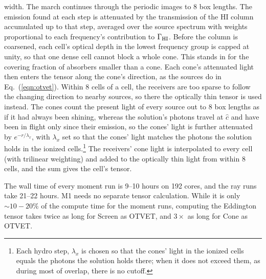 \documentclass[iop]{openjournal}
\begin{document}
\begin{itemize}
{  width. The march continues through the periodic images to 8 box
  lengths. The emission found at each step is attenuated by the
  transmission of the HI column accumulated up to that step, averaged
  over the source spectrum with weights proportional to each frequency's
  contribution to $\Gamma_{\rm HI}$. Before the column is coarsened, each
  cell's optical depth in the lowest frequency group is capped
  at unity, so that one dense cell cannot block a whole cone. This stands
  in for the covering fraction of absorbers smaller than a cone.}
 Each cone's attenuated light then enters the tensor along the cone's
direction, as the sources do in Eq.~(\ref{eqn:otvet}). Within 8 cells of a cell, the receivers are too sparse to follow the changing
  direction to nearby sources, so there the optically thin tensor is used
  instead.  The cones count the present light of every source out to 8 box lengths
as if it had always been shining, whereas the solution's photons travel
at $\hat c$ and have been in flight only since their emission, so the
cones' light is further attenuated by $e^{-r/\lambda_x}$, with
$\lambda_x$ set so that the cones' light matches the photons the solution holds in the ionized cells.\footnote{Each hydro step, $\lambda_x$ is chosen so that the
cones' light in the ionized cells equals the photons the solution holds
there; when it does not exceed them, as during most of overlap, there is
no cutoff.}  The receivers' cone light is interpolated to every cell (with trilinear weighting) and added to the optically thin light from within 8 cells, and the sum gives the cell's tensor.
\end{itemize}
The wall time of every moment run is 9--10 hours on 192 cores, and the ray runs take 21--22 hours. M1 needs no separate tensor calculation. While it is only $\sim 10-20\%$ of the compute time for the moment runs, computing the Eddington tensor takes twice as long for Screen as OTVET, and $3\times$ as long for Cone as OTVET. 
\end{document}
